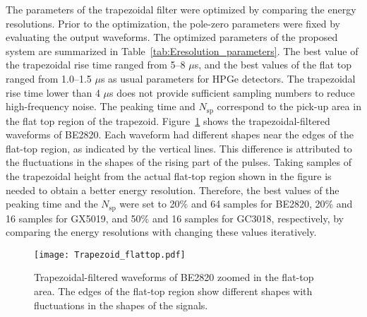 The parameters of the trapezoidal filter were optimized by comparing the energy resolutions.
Prior to the optimization, the pole-zero parameters 
were fixed by evaluating the output waveforms. %
The optimized parameters of the proposed system are summarized in Table~\ref{tab:Eresolution_parameters}. 
The best value of the trapezoidal rise time ranged from 5--8 $\mu$s, and the best values of the flat top ranged from 1.0--1.5 $\mu$s as usual parameters for HPGe detectors.
The trapezoidal rise time lower than 4 $\mu$s does not provide sufficient sampling numbers to reduce high-frequency noise.
The peaking time and $N_\mathrm{sp}$ correspond to the pick-up area in the flat top region of the trapezoid.
Figure~\ref{fig:trapezoid_flattop} shows the trapezoidal-filtered waveforms of BE2820. %
Each waveform had different shapes near the edges of the flat-top region, as indicated by the vertical lines.
This difference is attributed to the fluctuations in the %
shapes of the rising part of the pulses.
Taking samples of the trapezoidal height from the actual flat-top region shown in the figure is needed to obtain a better energy resolution.
Therefore, the best values of the peaking time and the $N_\mathrm{sp}$ were set to 20\% and 64 samples for BE2820, 20\% and 16 samples for GX5019, and 50\% and 16 samples for GC3018, respectively, by comparing the energy resolutions with changing these values iteratively.

\begin{figure}
  \centering
  \texttt{[image: Trapezoid\_flattop.pdf]}
  \caption{Trapezoidal-filtered waveforms of BE2820 zoomed in the flat-top area.
  The edges of the flat-top region show different shapes 
  with fluctuations in the shapes of the signals.}
  \label{fig:trapezoid_flattop}
\end{figure}


